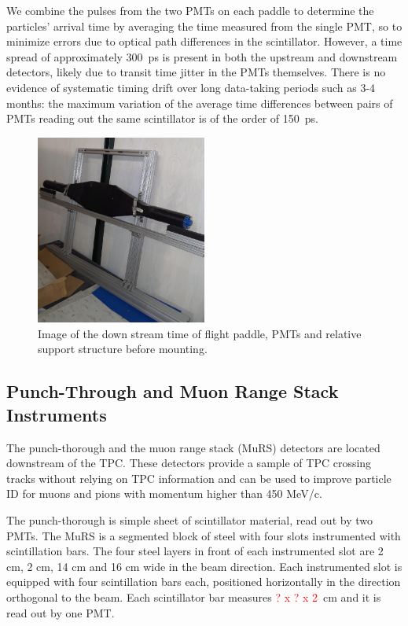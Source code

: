 We combine the pulses from the two PMTs on each paddle to determine the particles' arrival time by averaging the time measured from the single PMT, so to minimize errors due to optical path differences in the scintillator.  However, a time spread of approximately 300~ps is present in both the upstream and downstream detectors, likely due to transit time jitter in the PMTs themselves.  There is no evidence of systematic timing drift over long data-taking periods such as 3-4 months: the maximum variation of the average time differences between pairs of PMTs reading out the same scintillator is of the order of 150~ps.

\begin{figure}[h!]
\centering
\includegraphics[width=0.5\textwidth]{Chapter-3/Images/DSTOF.jpg}
\caption{Image of the down stream time of flight paddle, PMTs and relative support structure before mounting. } 
\label{pic:cosmicpaddle}
\end{figure}




\subsection{Punch-Through and Muon Range Stack Instruments}\label{sec:MuRS}

The punch-thorough and the muon range stack (MuRS) detectors are located downstream of the TPC. These detectors provide a sample of  TPC crossing tracks without relying on TPC information and can be used to improve particle ID for  muons and pions with momentum higher than  450 MeV/c.

The punch-thorough is simple sheet of scintillator material, read out by two PMTs. 
The MuRS is a segmented block of steel with four slots instrumented with scintillation bars. The four steel layers in front of each instrumented slot are 2 cm, 2 cm, 14 cm and 16 cm wide in the beam direction. Each instrumented slot is equipped with four scintillation bars each, positioned horizontally in the direction orthogonal to the beam. Each scintillator bar measures  \textcolor{red}{? x ? x 2}~cm and it is read out by one PMT.  

